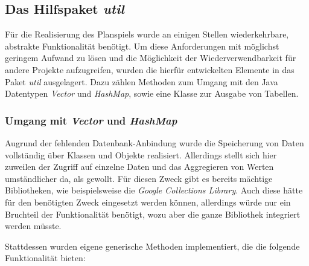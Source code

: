 \subsection{Das Hilfspaket \textit{util}}
\label{sub:fachkonzept-implementierung-util}


Für die Realisierung des Planspiels wurde an einigen Stellen wiederkehrbare, abstrakte Funktionalität benötigt. Um diese Anforderungen mit möglichst geringem Aufwand zu lösen und die Möglichkeit der Wiederverwendbarkeit für andere Projekte aufzugreifen, wurden die hierfür entwickelten Elemente in das Paket \textit{util} ausgelagert. Dazu zählen Methoden zum Umgang mit den Java Datentypen \textit{Vector} und \textit{HashMap}, sowie eine Klasse zur Ausgabe von Tabellen.

\subsubsection{Umgang mit \textit{Vector} und \textit{HashMap}}
Augrund der fehlenden Datenbank-Anbindung wurde die Speicherung von Daten vollständig über Klassen und Objekte realisiert. Allerdings stellt sich hier zuweilen der Zugriff auf einzelne Daten und das Aggregieren von Werten umständlicher da, als gewollt. Für diesen Zweck gibt es bereits mächtige Bibliotheken, wie beispielsweise die \textit{Google Collections Library}. Auch diese hätte für den benötigten Zweck eingesetzt werden können, allerdings würde nur ein Bruchteil der Funktionalität benötigt, wozu aber die ganze Bibliothek integriert werden müsste.

Stattdessen wurden eigene generische Methoden implementiert, die die folgende Funktionalität bieten:


